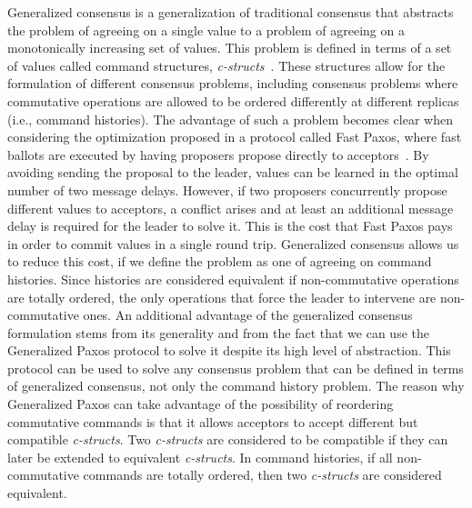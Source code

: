 Generalized consensus is a generalization of traditional consensus that abstracts the problem of agreeing on a single value to a problem of agreeing on a monotonically increasing set of values. This problem is defined in terms of a set of values called command structures, \textit{c-structs}~\cite{Lamport2005}. These structures allow for the formulation of different consensus problems, including consensus problems where commutative operations are allowed to be ordered differently at different replicas (i.e., command histories). The advantage of such a problem becomes clear when considering the optimization proposed in a protocol called Fast Paxos, where fast ballots are executed by having proposers propose directly to acceptors~\cite{Lamport2006}. By avoiding sending the proposal to the leader, values can be learned in the optimal number of two message delays. However, if two proposers concurrently propose different values to acceptors, a conflict arises and at least an additional message delay is required for the leader to solve it. This is the cost that Fast Paxos pays in order to commit values in a single round trip.  Generalized consensus allows us to reduce this cost, if we define the problem as one of agreeing on command histories. Since histories are considered equivalent if non-commutative operations are totally ordered, the only operations that force the leader to intervene are non-commutative ones. An additional advantage of the generalized consensus formulation stems from its generality and from the fact that we can use the Generalized Paxos protocol to solve it despite its high level of abstraction. This protocol can be used to solve any consensus problem that can be defined in terms of generalized consensus, not only the command history problem. The reason why Generalized Paxos can take advantage of the possibility of reordering commutative commands is that it allows acceptors to accept different but compatible \textit{c-structs}. Two \textit{c-structs} are considered to be compatible if they can later be extended to equivalent \textit{c-structs}. In command histories, if all non-commutative commands are totally ordered, then two \textit{c-structs} are considered equivalent. \par
